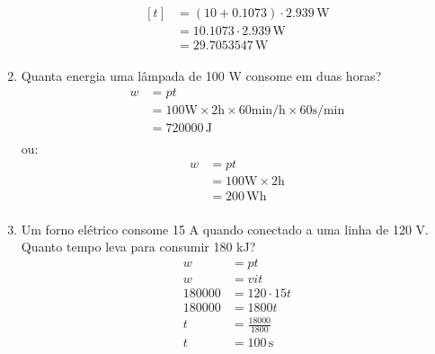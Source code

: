 \begin{enumerate}
\begin{align*}
\begin{aligned}[t]
			               & = \left(10 + 0.1073\right) \cdot 2.939 \,\text{W}                                                         \\
			               & = 10.1073 \cdot 2.939 \,\text{W}                                                                          \\
			               & = 29.7053547 \,\text{W}
		      \end{aligned}
	      \end{align*}
	\item Quanta energia uma lâmpada de 100 W consome em duas horas?
	      \[
		      \begin{aligned}
			      w & = pt                                                                           \\
			        & = 100 \text{W} \times 2 \text{h} \times 60 \text{min/h} \times 60 \text{s/min} \\
			        & = 720000 \, \text{J}                                                           \\
		      \end{aligned}
	      \]
	      ou:
	      \[
		      \begin{aligned}
			      w & = pt                             \\
			        & = 100 \text{W} \times 2 \text{h} \\
			        & = 200 \, \text{Wh}               \\
		      \end{aligned}
	      \]
	\item Um forno elétrico consome 15 A quando conectado a uma linha de 120 V.
	      Quanto tempo leva para consumir 180 kJ?
	      \[
		      \begin{aligned}
			      w      & = pt                 \\
			      w      & = vi t               \\
			      180000 & = 120 \cdot 15 t     \\
			      180000 & = 1800 t             \\
			      t      & = \frac{18000}{1800} \\
			      t      & = 100 \, \text{s}    \\
		      \end{aligned}
	      \]

\end{enumerate}
